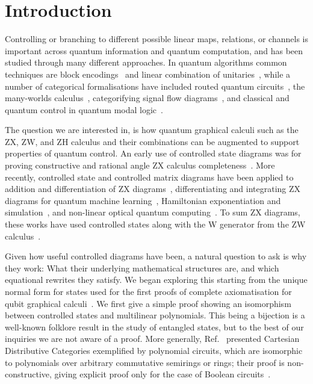 \section{Introduction}
Controlling or branching to different possible linear maps, relations, or channels is important across quantum information and quantum computation, and has been studied through many different approaches. In quantum algorithms common techniques are block encodings~\cite{gilyen2019qsvt, rall2020qalgsblockenc} and linear combination of unitaries~\cite{childs2012hamsimlcu}, while a number of categorical formalisations have included routed quantum circuits~\cite{vanrietvelde2021routed}, the many-worlds calculus~\cite{chardonnet2023manyworlds}, categorifying signal flow diagrams~\cite{baez2015categoriesctrl}, and classical and quantum control in quantum modal logic~\cite{sati2023quantummonadology}.

The question we are interested in, is how quantum graphical calculi such as the ZX, ZW, and ZH calculus and their combinations can be augmented to support properties of quantum control.
An early use of controlled state diagrams was for proving constructive and rational angle ZX calculus completeness~\cite{jeandel2018zxconstructive}. More recently, controlled state and controlled matrix diagrams have been applied to addition and differentiation of ZX diagrams~\cite{jeandel2024adddiffzx}, differentiating and integrating ZX diagrams for quantum machine learning~\cite{wang2022diffintzx}, Hamiltonian exponentiation and simulation~\cite{shaikh2022sum}, and non-linear optical quantum computing~\cite{de2023light}. To sum ZX diagrams, these works have used controlled states along with the W generator from the ZW calculus~\cite{coecke2010zw}.

Given how useful controlled diagrams have been, a natural question to ask is why they work: What their underlying mathematical structures are, and which equational rewrites they satisfy.
We began exploring this starting from the unique normal form for states used for the first proofs of complete axiomatisation for qubit graphical calculi~\cite{hadzihasanovic2017thesis, Hadzihasanovic2018zwzxcomplete}.
We first give a simple proof showing an isomorphism between controlled states and multilinear polynomials. This being a bijection is a well-known folklore result in the study of entangled states, but to the best of our inquiries we are not aware of a proof. More generally, Ref.~\cite{wilson2022diffpolycirc} presented Cartesian Distributive Categories exemplified by polynomial circuits, which are isomorphic to polynomials over arbitrary commutative semirings or rings; their proof is non-constructive, giving explicit proof only for the case of Boolean circuits~\cite{wilson2021revderbool}.

